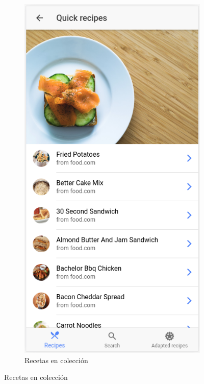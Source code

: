 \begin{figure}[H]
    \centering
    \begin{subfigure}[b]{0.32\linewidth}
        \includegraphics[width=\linewidth]{imagenes/app/pantallas/app_5.png}
        \caption{Recetas en colección}

\end{subfigure}
\end{figure}
